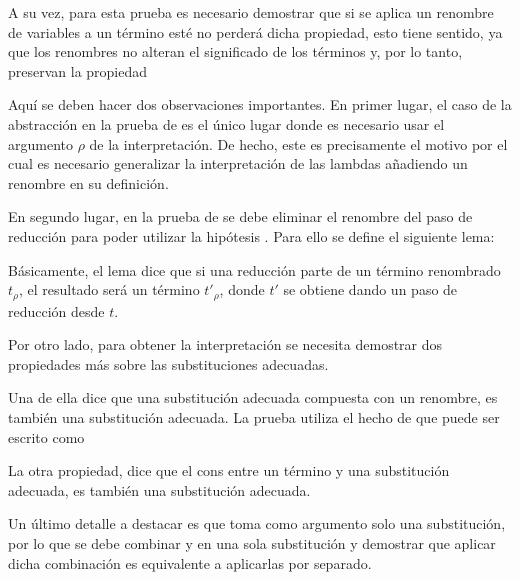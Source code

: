 
A su vez, para esta prueba es necesario demostrar que si se aplica un renombre de variables a un término \snstar esté no perderá dicha propiedad, esto tiene sentido, ya que los renombres no alteran el significado de los términos y, por lo tanto, preservan la propiedad \snstar


Aquí se deben hacer dos observaciones importantes.
En primer lugar, el caso de la abstracción en la prueba de  es el único lugar donde es necesario usar el argumento $\rho$ de la interpretación.
De hecho, este es precisamente el motivo por el cual es necesario generalizar la interpretación de las lambdas añadiendo un renombre en su definición.

En segundo lugar, en la prueba de  se debe eliminar el renombre del paso de reducción para poder utilizar la hipótesis .
Para ello se define el siguiente lema:


Básicamente, el lema dice que si una reducción parte de un término renombrado $t_\rho$, el resultado será un término $t'_\rho$, donde $t'$ se obtiene dando un paso de reducción desde $t$.


Por otro lado, para obtener la interpretación  se necesita demostrar dos propiedades más sobre las substituciones adecuadas.

Una de ella dice que una substitución adecuada compuesta con un renombre, es también una substitución adecuada.
La prueba utiliza el hecho de que   puede ser escrito como
\subst{\comp{\ids}{\bound{$\rho$}}}{}


La otra propiedad, dice que el cons entre un término \snstar y una substitución adecuada, es también una substitución adecuada.


Un último detalle a destacar es que  toma como argumento solo una substitución, por lo que se debe combinar \bound{$\sigma$} y
en una sola substitución y demostrar que aplicar dicha combinación es equivalente a aplicarlas por separado.

